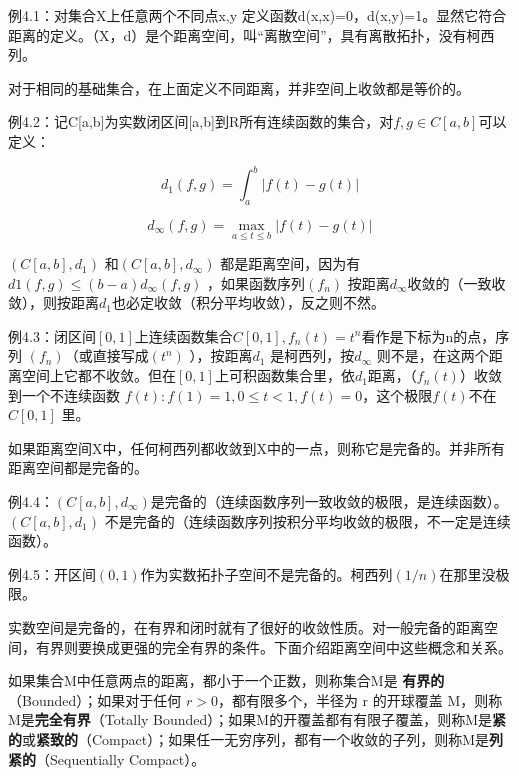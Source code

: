 \kaishu
\setlength{\leftskip}{1em}

例4.1：对集合X上任意两个不同点x,y 定义函数d(x,x)=0，d(x,y)=1。显然它符合距离的定义。（X，d）是个距离空间，叫“离散空间”，具有离散拓扑，没有柯西列。

\songti
\setlength{\leftskip}{0em}

对于相同的基础集合，在上面定义不同距离，并非空间上收敛都是等价的。

\kaishu
\setlength{\leftskip}{1em}

例4.2：记C[a,b]为实数闭区间[a,b]到R所有连续函数的集合，对$ f,g\in C[a,b] $可以定义：

\[ \displaystyle d_1(f,g) = \int_{a}^{b}|f(t)-g(t)| \]

\[ \displaystyle d_\infty(f,g) = \max_{a\leq t \leq b} |f(t)-g(t)|\]

\songti
\setlength{\leftskip}{0em}

$ (C[a,b],d_1) $ 和$ (C[a,b],d_\infty) $ 都是距离空间，因为有 $\displaystyle  d1(f,g)\leq (b−a)d_\infty(f,g) $ ，如果函数序列$ (f_n) $ 按距离$ d_\infty $收敛的（一致收敛），则按距离$ d_1 $也必定收敛（积分平均收敛），反之则不然。

\kaishu
\setlength{\leftskip}{1em}

例4.3：闭区间$ [0,1] $上连续函数集合$ C[0,1], f_n(t)=t^n $看作是下标为n的点，序列 $ (f_n) $（或直接写成$ (t^n) $ ），按距离$ d_1 $ 是柯西列，按$ d_\infty $ 则不是，在这两个距离空间上它都不收敛。但在$ [0,1] $上可积函数集合里，依$ d_1 $距离，（$ f_n(t) $）收敛到一个不连续函数 $ f(t): f(1)=1,0\leq t<1,f(t)=0 $，这个极限$ f(t) $不在$ C[0,1] $ 里。

\songti
\setlength{\leftskip}{0em}

如果距离空间X中，任何柯西列都收敛到X中的一点，则称它是完备的。并非所有距离空间都是完备的。

\kaishu
\setlength{\leftskip}{1em}

例4.4：$ (C[a,b],d_\infty) $是完备的（连续函数序列一致收敛的极限，是连续函数）。$ (C[a,b],d_1) $ 不是完备的（连续函数序列按积分平均收敛的极限，不一定是连续函数）。

例4.5：开区间$ (0, 1) $作为实数拓扑子空间不是完备的。柯西列$ (1/n) $在那里没极限。

\songti
\setlength{\leftskip}{0em}

实数空间是完备的，在有界和闭时就有了很好的收敛性质。对一般完备的距离空间，有界则要换成更强的完全有界的条件。下面介绍距离空间中这些概念和关系。

如果集合M中任意两点的距离，都小于一个正数，则称集合M是 \textbf{有界的} （Bounded）；如果对于任何 $ r> 0 $，都有限多个，半径为 r 的开球覆盖 M，则称M是\textbf{完全有界}（Totally   Bounded）；如果M的开覆盖都有有限子覆盖，则称M是\textbf{紧的}或\textbf{紧致的}（Compact）；如果任一无穷序列，都有一个收敛的子列，则称M是\textbf{列紧的}（Sequentially Compact）。

